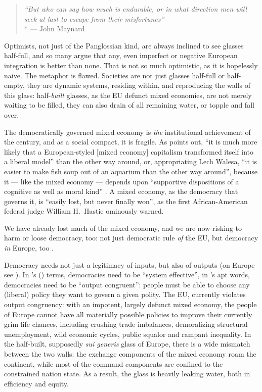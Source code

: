 \begin{quote}
	\emph{``But who can say how much is endurable, or in what direction men will seek at last to escape from their misfortunes''}
	\\*
	--- John Maynard \citet{Keynes1936}
\end{quote}

Optimists, not just of the Panglossian kind, are always inclined to see glasses half-full, and so many argue that any, even imperfect or negative European integration is better than none.
 That is not so much optimistic, as it is hopelessly naive.
The metaphor is flawed.
Societies are not just glasses half-full or half-empty, they are dynamic systems, residing within, and reproducing the walls of this glass:
half-\emph{built} glasses, as the \gls{EU} defunct mixed economies, are not merely waiting to be filled, they can also drain of all remaining water, or topple and fall over.

The democratically governed mixed economy is \emph{the} institutional achievement of the century, and as a social compact, it is fragile.
As \citeauthor{Offe2003} points out, ``it is much more likely that a European-styled [mixed economy] capitalism transformed itself into a liberal model'' than the other way around, or, appropriating Lech Walesa, ``it is easier to make fish soup out of an aquarium than the other way around'', because it --- like the mixed economy --- depends upon ``supportive dispositions of a cognitive as well as moral kind'' \citeyearpar[446]{Offe2003}.
A mixed economy, as the democracy that governs it, is ``easily lost, but never finally won'', as the first African-American federal judge William H.~Hastie ominously warned.

We have already lost much of the mixed economy, and we are now risking to harm or loose democracy, too:
not just democratic rule \emph{of} the \gls{EU}, but democracy \emph{in} Europe, too \citep[19]{Scharpf1997}.

Democracy needs not just a legitimacy of inputs, but also of outputs (on Europe see \citealt{SchaGove1999}).
In \citeauthor{Dahl-1994-ab}'s (\citeyear{Dahl-1994-ab}) terms, democracies need to be ``system effective'', in \citeauthor{Zurn-2000-aa}'s \citeyearpar{Zurn-2000-aa} apt words, democracies need to be ``output congruent'':
people must be able to choose any (liberal) policy they want to govern a given polity.
The \gls{EU}, currently violates output congruency:
with an impotent, largely defunct mixed economy, the people of Europe cannot have all materially possible policies to improve their currently grim life chances, including crushing trade imbalances, demoralizing structural unemployment, wild economic cycles, public squalor and rampant inequality.
In the half-built, supposedly \emph{sui generis} glass of Europe, there is a wide mismatch between the two walls:
the exchange components of the mixed economy roam the continent, while most of the command components are confined to the constrained nation state.
As a result, the glass is heavily leaking water, both in efficiency and equity.

